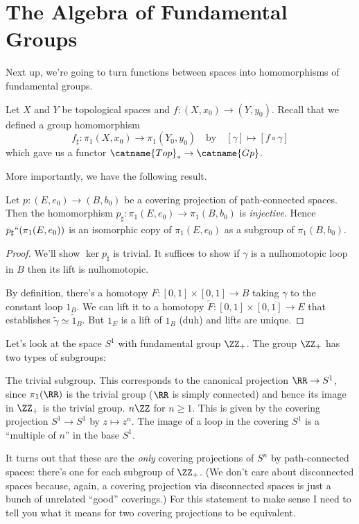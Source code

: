 \section{The Algebra of Fundamental Groups}
Next up, we're going to turn functions between spaces into homomorphisms of fundamental groups.

Let $X$ and $Y$ be topological spaces and $f : (X, x_0) \to (Y, y_0)$.
Recall that we defined a group homomorphism
\[ f_\sharp : \pi_1(X, x_0) \to \pi_1(Y_0, y_0) 
	\quad\text{by}\quad
	[\gamma] \mapsto [f \circ \gamma] \]
which gave us a functor $\catname{Top}_\ast \to \catname{Gp}$.

More importantly, we have the following result.
\begin{proposition}
	Let $p : (E,e_0) \to (B,b_0)$ be a covering projection of path-connected spaces.
	Then the homomorphism $p_\sharp : \pi_1(E, e_0) \to \pi_1(B, b_0)$ is \emph{injective}.
	Hence $p_\sharp ``(\pi_1(E, e_0))$ is an isomorphic copy of $\pi_1(E, e_0)$ 
	as a subgroup of $\pi_1(B, b_0)$.
\end{proposition}
\begin{proof}
	We'll show $\ker p_\sharp$ is trivial.
	It suffices to show if $\gamma$ is a nulhomotopic loop in $B$ 
	then its lift is nulhomotopic.

	By definition, there's a homotopy $F : [0,1] \times [0,1] \to B$
	taking $\gamma$ to the constant loop $1_B$.
	We can lift it to a homotopy $\tilde F : [0,1] \times [0,1] \to E$
	that establishes $\tilde\gamma \simeq \tilde 1_B$.
	But $1_E$ is a lift of $1_B$ (duh) and lifts are unique.
\end{proof}

\begin{example}[Subgroups of $\ZZ_+$]
	Let's look at the space $S^1$ with fundamental group $\ZZ_+$.
	The group $\ZZ_+$ has two types of subgroups:
	\begin{itemize}
		\ii The trivial subgroup.
		This corresponds to the canonical projection $\RR \to S^1$,
		since $\pi_1(\RR)$ is the trivial group ($\RR$ is simply connected)
		and hence its image in $\ZZ_+$ is the trivial group.
		\ii $n\ZZ$ for $n \ge 1$.
		This is given by the covering projection $S^1 \to S^1$
		by $z \mapsto z^n$.
		The image of a loop in the covering $S^1$ is a ``multiple of $n$''
		in the base $S^1$.
	\end{itemize}
\end{example}

It turns out that these are the \emph{only} covering projections of $S^n$ by path-connected spaces: there's one for each subgroup of $\ZZ_+$.
(We don't care about disconnected spaces because, again, a covering projection
via disconnected spaces is just a bunch of unrelated ``good'' coverings.)
For this statement to make sense I need to tell you what it means for
two covering projections to be equivalent.

